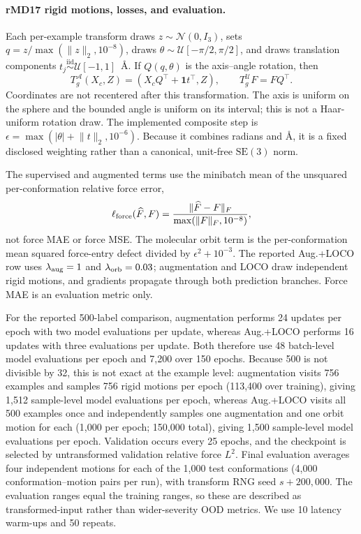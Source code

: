 \paragraph{rMD17 rigid motions, losses, and evaluation.}
Each per-example transform draws
\(z\sim\mathcal N(0,I_3)\), sets
\(q=z/\max(\lVert z\rVert_2,10^{-8})\), draws
\(\theta\sim\mathcal U[-\pi/2,\pi/2]\), and draws translation components
\(t_j\stackrel{\mathrm{iid}}{\sim}\mathcal U[-1,1]\)~\AA.  If
\(Q(q,\theta)\) is the axis--angle rotation, then
\[
T_g^{\mathcal A}(X_c,Z)=(X_cQ^\top+\mathbf 1t^\top,Z),\qquad
T_g^{\mathcal U}F=FQ^\top.
\]
Coordinates are not recentered after this transformation.  The axis is uniform on
the sphere and the bounded angle is uniform on its interval; this is not a
Haar-uniform rotation draw.  The implemented composite step is
\(\epsilon=\max(|\theta|+\lVert t\rVert_2,10^{-6})\).  Because it combines
radians and \AA, it is a fixed disclosed weighting rather than a canonical,
unit-free \(\mathrm{SE}(3)\) norm.

The supervised and augmented terms use the minibatch mean of the unsquared
per-conformation relative force error,
\[
\ell_{\rm force}(\widehat F,F)
=\frac{\lVert\widehat F-F\rVert_F}{\max(\lVert F\rVert_F,10^{-8})},
\]
not force MAE or force MSE.  The molecular orbit term is the per-conformation mean
squared force-entry defect divided by \(\epsilon^2+10^{-3}\).  The reported
Aug.+LOCO row uses \(\lambda_{\rm aug}=1\) and
\(\lambda_{\rm orb}=0.03\); augmentation and LOCO draw independent rigid motions,
and gradients propagate through both prediction branches.  Force MAE is an
evaluation metric only.

For the reported 500-label comparison, augmentation performs 24 updates per epoch
with two model evaluations per update, whereas Aug.+LOCO performs 16 updates with
three evaluations per update.  Both therefore use 48 batch-level model evaluations
per epoch and 7,200 over 150 epochs.  Because 500 is not divisible by 32, this is
not exact at the example level: augmentation visits 756 examples and samples 756
rigid motions per epoch (113,400 over training), giving 1,512 sample-level model
evaluations per epoch, whereas Aug.+LOCO visits all 500 examples once and
independently samples one augmentation and one orbit motion for each (1,000 per
epoch; 150,000 total), giving 1,500 sample-level model evaluations per epoch.
Validation occurs every 25 epochs, and the
checkpoint is selected by untransformed validation relative force \(L^2\).  Final
evaluation averages four independent motions for each of the 1,000 test
conformations (4,000 conformation--motion pairs per run), with transform RNG seed
\(s+200{,}000\).  The evaluation ranges equal the training ranges, so these are
described as transformed-input rather than wider-severity OOD metrics.  We use 10
latency warm-ups and 50 repeats.

